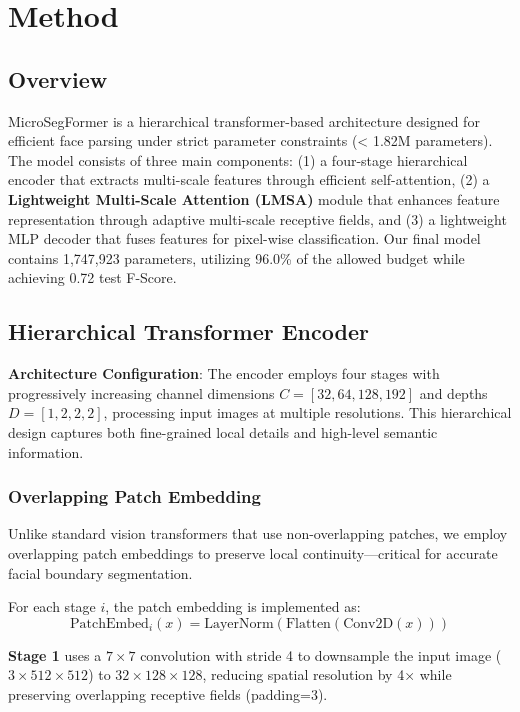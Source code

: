 \section{Method}
\label{sec:method}

\subsection{Overview}

MicroSegFormer is a hierarchical transformer-based architecture designed for efficient face parsing under strict parameter constraints (< 1.82M parameters). The model consists of three main components: (1) a four-stage hierarchical encoder that extracts multi-scale features through efficient self-attention, (2) a \textbf{Lightweight Multi-Scale Attention (LMSA)} module that enhances feature representation through adaptive multi-scale receptive fields, and (3) a lightweight MLP decoder that fuses features for pixel-wise classification. Our final model contains 1,747,923 parameters, utilizing 96.0\% of the allowed budget while achieving 0.72 test F-Score.

\subsection{Hierarchical Transformer Encoder}

\textbf{Architecture Configuration}: The encoder employs four stages with progressively increasing channel dimensions $C = [32, 64, 128, 192]$ and depths $D = [1, 2, 2, 2]$, processing input images at multiple resolutions. This hierarchical design captures both fine-grained local details and high-level semantic information.

\subsubsection{Overlapping Patch Embedding}

Unlike standard vision transformers that use non-overlapping patches, we employ overlapping patch embeddings to preserve local continuity—critical for accurate facial boundary segmentation.

For each stage $i$, the patch embedding is implemented as:
\begin{equation}
\text{PatchEmbed}_i(x) = \text{LayerNorm}(\text{Flatten}(\text{Conv2D}(x)))
\end{equation}

\textbf{Stage 1} uses a $7\times7$ convolution with stride 4 to downsample the input image ($3\times512\times512$) to $32\times128\times128$, reducing spatial resolution by 4× while preserving overlapping receptive fields (padding=3).

